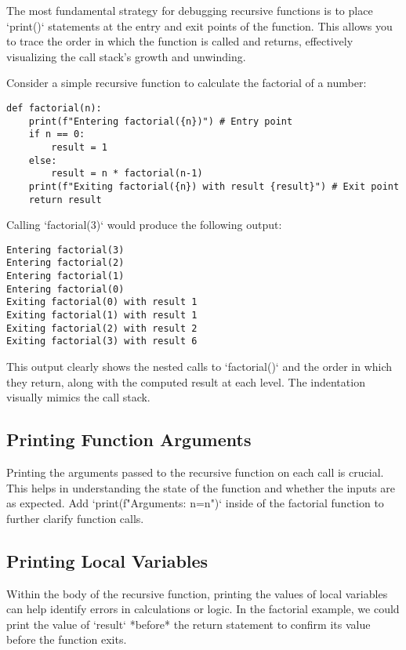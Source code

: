 \documentclass{article}
\begin{document}
{{{The most fundamental strategy for debugging recursive functions is to place `print()` statements at the entry and exit points of the function. This allows you to trace the order in which the function is called and returns, effectively visualizing the call stack's growth and unwinding.

Consider a simple recursive function to calculate the factorial of a number:

\begin{verbatim}
def factorial(n):
    print(f"Entering factorial({n})") # Entry point
    if n == 0:
        result = 1
    else:
        result = n * factorial(n-1)
    print(f"Exiting factorial({n}) with result {result}") # Exit point
    return result
\end{verbatim}

Calling `factorial(3)` would produce the following output:

\begin{verbatim}
Entering factorial(3)
Entering factorial(2)
Entering factorial(1)
Entering factorial(0)
Exiting factorial(0) with result 1
Exiting factorial(1) with result 1
Exiting factorial(2) with result 2
Exiting factorial(3) with result 6
\end{verbatim}

This output clearly shows the nested calls to `factorial()` and the order in which they return, along with the computed result at each level. The indentation visually mimics the call stack.

\subsection*{Printing Function Arguments}

Printing the arguments passed to the recursive function on each call is crucial. This helps in understanding the state of the function and whether the inputs are as expected. Add `print(f"Arguments: n={n}")` inside of the factorial function to further clarify function calls.

\subsection*{Printing Local Variables}

Within the body of the recursive function, printing the values of local variables can help identify errors in calculations or logic. In the factorial example, we could print the value of `result` *before* the return statement to confirm its value before the function exits.

}}}
\end{document}
